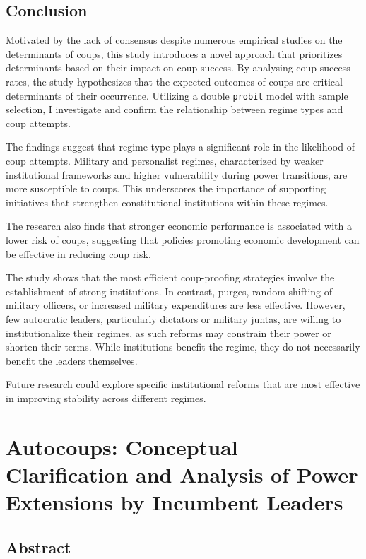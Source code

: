 \documentclass[
  12pt,
]{report}
\begin{document}
\section{Conclusion}\label{conclusion}

Motivated by the lack of consensus despite numerous empirical studies on
the determinants of coups, this study introduces a novel approach that
prioritizes determinants based on their impact on coup success. By
analysing coup success rates, the study hypothesizes that the expected
outcomes of coups are critical determinants of their occurrence.
Utilizing a double \texttt{probit} model with sample selection, I
investigate and confirm the relationship between regime types and coup
attempts.

The findings suggest that regime type plays a significant role in the
likelihood of coup attempts. Military and personalist regimes,
characterized by weaker institutional frameworks and higher
vulnerability during power transitions, are more susceptible to coups.
This underscores the importance of supporting initiatives that
strengthen constitutional institutions within these regimes.

The research also finds that stronger economic performance is associated
with a lower risk of coups, suggesting that policies promoting economic
development can be effective in reducing coup risk.

The study shows that the most efficient coup-proofing strategies involve
the establishment of strong institutions. In contrast, purges, random
shifting of military officers, or increased military expenditures are
less effective. However, few autocratic leaders, particularly dictators
or military juntas, are willing to institutionalize their regimes, as
such reforms may constrain their power or shorten their terms. While
institutions benefit the regime, they do not necessarily benefit the
leaders themselves.

Future research could explore specific institutional reforms that are
most effective in improving stability across different regimes.

\chapter{Autocoups: Conceptual Clarification and Analysis of Power
Extensions by Incumbent Leaders}\label{sec-chapter3}

\section*{Abstract}\label{abstract-1}
\end{document}
